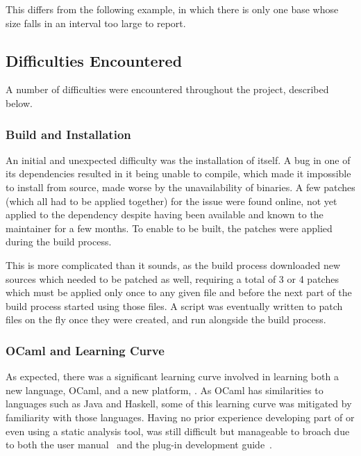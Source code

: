 This differs from the following example, in which there is only one base whose size falls in an interval too large to report.



\subsection{Difficulties Encountered}

A number of difficulties were encountered throughout the project, described below.

\subsubsection{Build and Installation}

An initial and unexpected difficulty was the installation of  itself. A bug in one of its dependencies resulted in it being unable to compile, which made it impossible to install from source, made worse by the unavailability of binaries. A few patches (which all had to be applied together) for the issue were found online, not yet applied to the dependency despite having been available and known to the maintainer for a few months. To enable  to be built, the patches were applied during the build process.

This is more complicated than it sounds, as the build process downloaded new sources which needed to be patched as well, requiring a total of 3 or 4 patches which must be applied only once to any given file and before the next part of the build process started using those files. A script was eventually written to patch files on the fly once they were created, and run alongside the build process.

\subsubsection{OCaml and  Learning Curve}

As expected, there was a significant learning curve involved in learning both a new language, OCaml, and a new platform, . As OCaml has similarities to languages such as Java and Haskell, some of this learning curve was mitigated by familiarity with those languages. Having no prior experience developing part of or even using a static analysis tool,  was still difficult but manageable to broach due to both the user manual~\cite{framauser} and the plug-in development guide~\cite{framaplug}.

